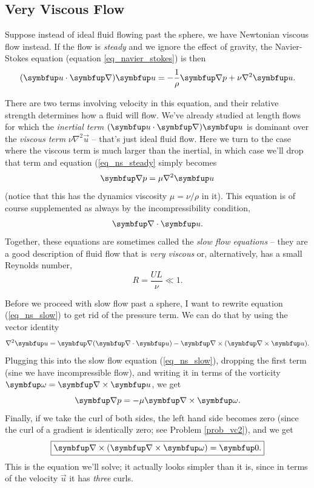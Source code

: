 \subsection{Very Viscous Flow}

Suppose instead of ideal fluid flowing past the sphere, we have Newtonian viscous flow instead.  If the flow is \emph{steady} and we ignore the effect of gravity, the Navier-Stokes equation (equation \ref{eq_navier_stokes}) is then
\begin{equation}
\label{eq_ns_steady}
(\vec{u} \cdot \grad ) \vec{u} = -\frac{1}{\rho} \grad p + \nu \nabla^2 \vec{u}.
\end{equation}

There are two terms involving velocity in this equation, and their relative strength determines how a fluid will flow.  We've already studied at length flows for which the \emph{inertial term} $(\vec{u} \cdot \grad ) \vec{u}$ is dominant over the \emph{viscous term} $\nu \nabla^2 \vec{u}$ -- that's just ideal fluid flow.  Here we turn to the case where the viscous term is much larger than the inertial, in which case we'll drop that term and equation (\ref{eq_ns_steady} simply becomes
\begin{equation}
\label{eq_ns_slow}
\grad p = \mu \nabla^2 \vec{u}
\end{equation}
(notice that this has the dynamics viscosity $\mu = \nu / \rho$ in it).  This equation is of course supplemented as always by the incompressibility condition,
\begin{equation}
\grad \cdot \vec{u}.
\end{equation}
Together, these equations are sometimes called the \emph{slow flow equations} -- they are a good description of fluid flow that is \emph{very viscous} or, alternatively, has a small Reynolds number,
\[
R = \frac{UL}{\nu} \ll 1.
\]

Before we proceed with slow flow past a sphere, I want to rewrite equation (\ref{eq_ns_slow}) to get rid of the pressure term.  We can do that by using the vector identity 
\[
\nabla^2 \vec{u} = \grad (\grad \cdot \vec{u}) - \grad \times (\grad \times \vec{u}).
\]
Plugging this into the slow flow equation (\ref{eq_ns_slow}), dropping the first term (sine we have incompressible flow), and writing it in terms of the vorticity $\vec{\omega} = \grad \times \vec{u}$, we get
\begin{equation}
\label{eq_ns_slow_p}
\grad p =  -\mu \grad \times \vec{\omega}.
\end{equation}
Finally, if we take the curl of both sides, the left hand side becomes zero (since the curl of a gradient is identically zero; see Problem \ref{prob_vc2}), and we get
\begin{equation}
\label{eq_slow_flow_curl}
\boxed{
\grad \times (\grad \times \vec{\omega}) = \vec{0}.
}
\end{equation}
This is the equation we'll solve; it actually looks simpler than it is, since in terms of the velocity $\vec{u}$ it has \emph{three} curls.

